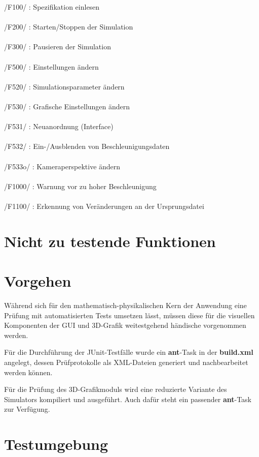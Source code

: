 /F100/ : Spezifikation einlesen\\
\\
/F200/ : Starten/Stoppen der Simulation\\
\\
/F300/ : Pausieren der Simulation\\
\\
/F500/ : Einstellungen ändern\\
\\
/F520/ : Simulationsparameter ändern\\
\\
/F530/ : Grafische Einstellungen ändern\\
\\
/F531/ : Neuanordnung (Interface)\\
\\
/F532/ : Ein-/Ausblenden von Beschleunigungsdaten\\
\\
/F533o/ : Kameraperspektive ändern\\
\\
/F1000/ : Warnung vor zu hoher Beschleunigung\\
\\
/F1100/ : Erkennung von Veränderungen an der Ursprungsdatei



\section{Nicht zu testende Funktionen}


\section{Vorgehen}

Während sich für den mathematisch-physikalischen Kern der Anwendung eine Prüfung mit automatisierten Tests umsetzen lässt, müssen diese für die visuellen Komponenten der GUI und 3D-Grafik weitestgehend händische vorgenommen werden.

Für die Durchführung der JUnit-Testfälle wurde ein \textbf{ant}-Task in der \textbf{build.xml} angelegt, dessen Prüfprotokolle als XML-Dateien generiert und nachbearbeitet werden können.

Für die Prüfung des 3D-Grafikmoduls wird eine reduzierte Variante des Simulators kompiliert und ausgeführt. Auch dafür steht ein passender \textbf{ant}-Task zur Verfügung.


\section{Testumgebung}


